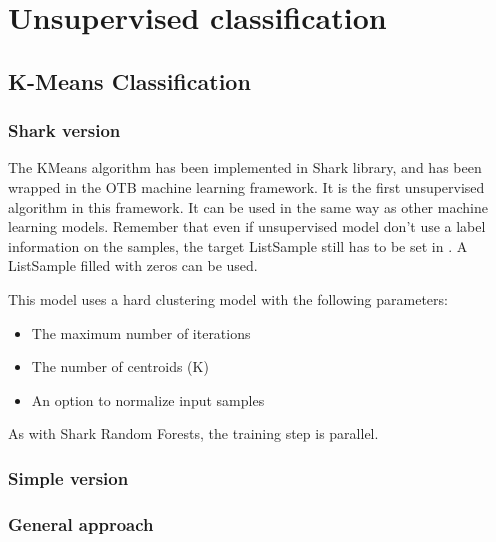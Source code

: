 \ifitkFullVersion

\fi


\section{Unsupervised classification}

\subsection{K-Means Classification}
\label{sec:KMeansClassifier}

\subsubsection{Shark version}

The KMeans algorithm has been implemented in Shark library, and has been
wrapped in the OTB machine learning framework. It is the first unsupervised
algorithm in this framework. It can be used in the same way as other machine
learning models. Remember that even if unsupervised model don't use a label
information on the samples, the target ListSample still has to be set in
. A ListSample filled with zeros can be used.

This model uses a hard clustering model with the following parameters:
\begin{itemize}
\item The maximum number of iterations
\item The number of centroids (K)
\item An option to normalize input samples
\end{itemize}

As with Shark Random Forests, the training step is parallel.

\subsubsection{Simple version}
\ifitkFullVersion

\fi
\ifitkFullVersion

\fi

\subsubsection{General approach}
\ifitkFullVersion

\fi

